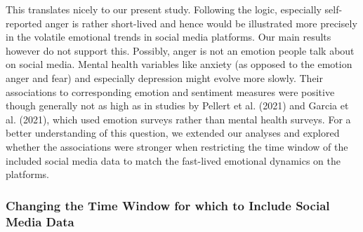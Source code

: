 \documentclass[
  english,
  jou,floatsintext]{apa7}
\begin{document}
This translates nicely to our present study. Following the logic, especially self-reported anger is rather short-lived and hence would be illustrated more precisely in the volatile emotional trends in social media platforms. Our main results however do not support this. Possibly, anger is not an emotion people talk about on social media. Mental health variables like anxiety (as opposed to the emotion anger and fear) and especially depression might evolve more slowly. Their associations to corresponding emotion and sentiment measures were positive though generally not as high as in studies by Pellert et al. (2021) and Garcia et al. (2021), which used emotion surveys rather than mental health surveys. For a better understanding of this question, we extended our analyses and explored whether the associations were stronger when restricting the time window of the included social media data to match the fast-lived emotional dynamics on the platforms.

\hypertarget{changing-the-time-window-for-which-to-include-social-media-data}{%
\subsubsection{Changing the Time Window for which to Include Social Media Data}\label{changing-the-time-window-for-which-to-include-social-media-data}}
\end{document}
